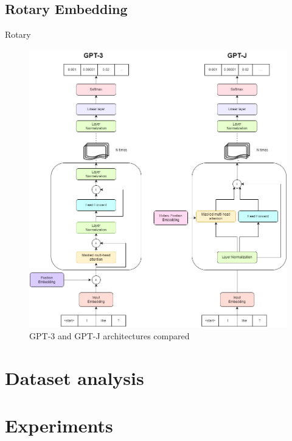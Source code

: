 \documentclass{article}
\begin{document}
\subsection{Rotary Embedding}
Rotary 

\begin{figure}[h] 
    \includegraphics[width=\textwidth]{gptJ_vs_gpt_architecture.drawio.png}
    \caption{GPT-3 and GPT-J architectures compared}
    \label{GPT-architectures}
\end{figure}    



\section{Dataset analysis}


\section{Experiments}


 

    
\end{document}
